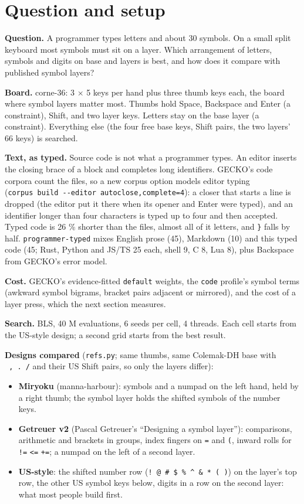\documentclass{gecko-paper}
\begin{document}
{\small
\section{Question and setup}

\textbf{Question.} A programmer types letters and about 30 symbols. On a small split keyboard most symbols must sit on a layer. Which arrangement of letters, symbols and digits on base and layers is best, and how does it compare with published symbol layers?

\textbf{Board.} corne-36: 3 $\times$ 5 keys per hand plus three thumb keys each, the board where symbol layers matter most. Thumbs hold Space, Backspace and Enter (a constraint), Shift, and two layer keys. Letters stay on the base layer (a constraint). Everything else (the four free base keys, Shift pairs, the two layers' 66 keys) is searched.

\textbf{Text, as typed.} Source code is not what a programmer types. An editor inserts the closing brace of a block and completes long identifiers. GECKO's code corpora count the files, so a new corpus option models editor typing (\texttt{corpus\ build\ -\/-editor\ autoclose,complete=4}): a closer that starts a line is dropped (the editor put it there when its opener and Enter were typed), and an
identifier longer than four characters is typed up to four and then accepted. Typed code is 26 \% shorter than the files, almost all of it letters, and \texttt{\}} falls by half. \texttt{programmer-typed} mixes English prose (45), Markdown (10) and this typed code (45; Rust, Python and JS/TS 25 each, shell 9, C 8, Lua 8), plus Backspace from GECKO's error model.

\textbf{Cost.} GECKO's evidence-fitted \texttt{default} weights, the \texttt{code} profile's symbol terms (awkward symbol bigrams, bracket pairs adjacent or mirrored), and the cost of a layer press, which the next section measures.

\textbf{Search.} BLS, 40 M evaluations, 6 seeds per cell, 4 threads. Each cell starts from the US-style design; a second grid starts from the best result.

\textbf{Designs compared} (\texttt{refs.py}; same thumbs, same Colemak-DH base with \texttt{\textquotesingle{}\ ,\ .\ /} and their US Shift pairs, so only the layers differ):

\begin{itemize}
\setlength{\itemsep}{1pt}\setlength{\parskip}{0pt}
\item
  \textbf{Miryoku} (manna-harbour): symbols and a numpad on the left hand, held by a right thumb; the symbol layer holds the shifted symbols of the number keys.
\item
  \textbf{Getreuer v2} (Pascal Getreuer's “Designing a symbol layer”): comparisons, arithmetic and brackets in groups, index fingers on \texttt{=} and \texttt{(}, inward rolls for \texttt{!=} \texttt{\textless{}=} \texttt{+=}; a numpad on the left of a second layer.
\item
  \textbf{US-style}: the shifted number row (\texttt{!\ @\ \#\ \$\ \%\ \^{}\ \&\ *\ (\ )}) on the layer's top row, the other US symbol keys below, digits in a row on the second layer: what most people build first.
\end{itemize}

}
\end{document}

